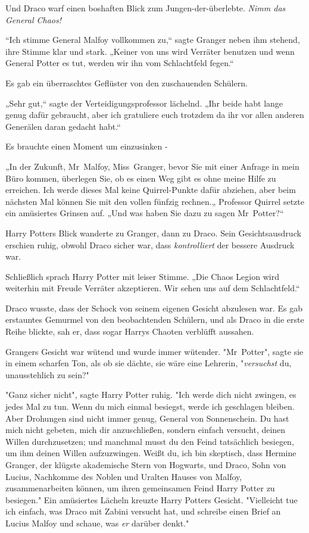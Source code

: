 {Und Draco warf einen boshaften Blick zum Jungen-der-überlebte. \emph{Nimm das General Chaos!}

“Ich stimme General Malfoy vollkommen zu,“ sagte Granger neben ihm stehend, ihre Stimme klar und stark. „Keiner von uns wird Verräter benutzen und wenn General Potter es tut, werden wir ihn vom Schlachtfeld fegen.“

Es gab ein überraschtes Geflüster von den zuschauenden Schülern.

„Sehr gut,“ sagte der Verteidigungsprofessor lächelnd. „Ihr beide habt lange genug dafür gebraucht, aber ich gratuliere euch trotzdem da ihr vor allen anderen Generälen daran gedacht habt.“

Es brauchte einen Moment um einzusinken -

„In der Zukunft, Mr~Malfoy, Miss~Granger, bevor Sie mit einer Anfrage in mein Büro kommen, überlegen Sie, ob es einen Weg gibt es ohne meine Hilfe zu erreichen. Ich werde dieses Mal keine Quirrel-Punkte dafür abziehen, aber beim nächsten Mal können Sie mit den vollen fünfzig rechnen.„ Professor Quirrel setzte ein amüsiertes Grinsen auf. „Und was haben Sie dazu zu sagen Mr~Potter?“

Harry Potters Blick wanderte zu Granger, dann zu Draco. Sein Gesichtsausdruck erschien ruhig, obwohl Draco sicher war, dass \emph{kontrolliert} der bessere Ausdruck war.

Schließlich sprach Harry Potter mit leiser Stimme. „Die Chaos Legion wird weiterhin mit Freude Verräter akzeptieren. Wir sehen uns auf dem Schlachtfeld.“

Draco wusste, dass der Schock von seinem eigenen Gesicht abzulesen war. Es gab erstauntes Gemurmel von den beobachtenden Schülern, und als Draco in die erste Reihe blickte, sah er, dass sogar Harrys Chaoten verblüfft aussahen.

Grangers Gesicht war wütend und wurde immer wütender. "Mr~Potter", sagte sie in einem scharfen Ton, als ob sie dächte, sie wäre eine Lehrerin, "\emph{versuchst} du, unausstehlich zu sein?"

"Ganz sicher nicht", sagte Harry Potter ruhig. "Ich werde dich nicht zwingen, es jedes Mal zu tun. Wenn du mich einmal besiegst, werde ich geschlagen bleiben. Aber Drohungen sind nicht immer genug, General von Sonnenschein. Du hast mich nicht gebeten, mich dir anzuschließen, sondern einfach versucht, deinen Willen durchzusetzen; und manchmal musst du den Feind tatsächlich besiegen, um ihm deinen Willen aufzuzwingen. Weißt du, ich bin skeptisch, dass Hermine Granger, der klügste akademische Stern von Hogwarts, und Draco, Sohn von Lucius, Nachkomme des Noblen und Uralten Hauses von Malfoy, zusammenarbeiten können, um ihren gemeinsamen Feind Harry Potter zu besiegen." Ein amüsiertes Lächeln kreuzte Harry Potters Gesicht. "Vielleicht tue ich einfach, was Draco mit Zabini versucht hat, und schreibe einen Brief an Lucius Malfoy und schaue, was \emph{er} darüber denkt."

}
